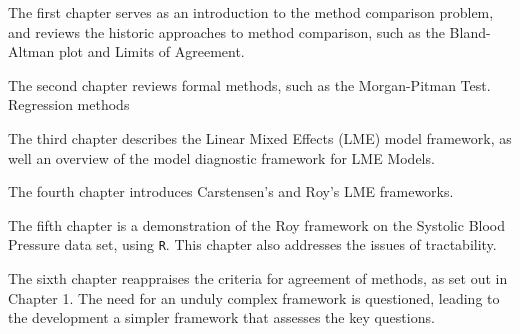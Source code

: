 
The first chapter serves as an introduction to the method comparison problem, and reviews the 
historic approaches to method comparison, such as the Bland-Altman plot and Limits of Agreement.

The second chapter reviews formal methods, such as the Morgan-Pitman Test. Regression methods 

The third chapter describes the Linear Mixed Effects (LME) model framework, as well an overview of the 
model diagnostic framework for LME Models.

The fourth chapter introduces Carstensen's and Roy's LME frameworks.

The fifth chapter is a demonstration of the Roy framework on the Systolic Blood Pressure data set, using \texttt{R}.
This chapter also addresses the issues of tractability.

The sixth chapter reappraises the criteria for agreement of methods, as set out in Chapter 1. 
The need for an unduly complex framework is questioned, leading to the development a simpler 
framework that assesses the key questions.
